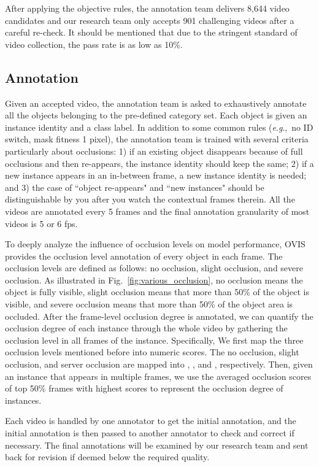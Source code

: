\documentclass[twocolumn]{svjour3}          \smartqed  \usepackage{graphicx}
\newcommand{\eg}{\textit{e}.\textit{g}.}
\begin{document}
\begin{sloppypar}
After applying the objective rules, the annotation team delivers 8,644 video candidates and our research team only accepts 901 challenging videos after a careful re-check. It should be mentioned that due to the stringent standard of video collection, the pass rate is as low as 10\%. 

\subsection{Annotation}
\label{annotation}

Given an accepted video, the annotation team is asked to exhaustively annotate all the objects belonging to the pre-defined category set. Each object is given an instance identity and a class label. In addition to some common rules (\eg,~no ID switch, mask fitness 1 pixel), the annotation team is trained with several criteria particularly about occlusions: 1) if an existing object disappears because of full occlusions and then re-appears, the instance identity should keep the same; 2) if a new instance appears in an in-between frame, a new instance identity is needed; and 3) the case of ``object re-appears" and ``new instances" should be distinguishable by you after you watch the contextual frames therein. All the videos are annotated every 5 frames and the final annotation granularity of most videos is 5 or 6 fps.

To deeply analyze the influence of occlusion levels on model performance, OVIS provides the occlusion level annotation of every object in each frame. The occlusion levels are defined as follows: no occlusion, slight occlusion, and severe occlusion. As illustrated in Fig.~\ref{fig:various_occlusion}, no occlusion means the object is fully visible, slight occlusion means that more than 50\% of the object is visible, and severe occlusion means that more than 50\% of the object area is occluded. After the frame-level occlusion degree is annotated, we can quantify the occlusion degree of each instance through the whole video by gathering the occlusion level in all frames of the instance. Specifically, We first map the three occlusion levels mentioned before into numeric scores. The no occlusion, slight occlusion, and server occlusion are mapped into , , and , respectively. Then, given an instance that appears in multiple frames, we use the averaged occlusion scores of top 50\% frames with highest scores to represent the occlusion degree of instances.

Each video is handled by one annotator to get the initial annotation, and the initial annotation is then passed to another annotator to check and correct if necessary. The final annotations will be examined by our research team and sent back for revision if deemed below the required quality.


\end{sloppypar}
\end{document}
